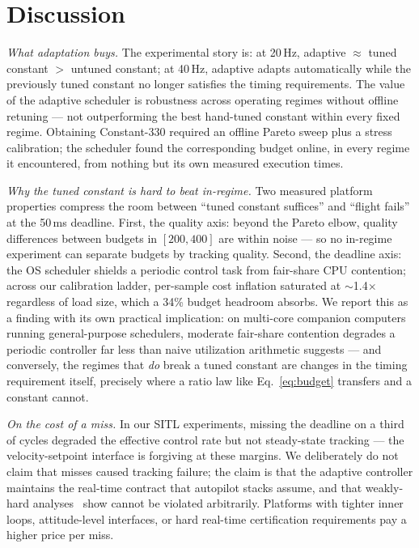 \documentclass[conference]{IEEEtran}
\begin{document}
\section{Discussion}
\label{sec:discussion}

\emph{What adaptation buys.} The experimental story is: at 20\,Hz,
adaptive $\approx$ tuned constant $>$ untuned constant; at 40\,Hz,
adaptive adapts automatically while the previously tuned constant no
longer satisfies the timing requirements. The value of the adaptive
scheduler is robustness across operating regimes without offline
retuning --- not outperforming the best hand-tuned constant within every
fixed regime. Obtaining Constant-330 required an offline Pareto sweep
plus a stress calibration; the scheduler found the corresponding budget
online, in every regime it encountered, from nothing but its own
measured execution times.

\emph{Why the tuned constant is hard to beat in-regime.} Two measured
platform properties compress the room between ``tuned constant
suffices'' and ``flight fails'' at the 50\,ms deadline. First, the
quality axis: beyond the Pareto elbow, quality differences between
budgets in $[200, 400]$ are within noise --- so no in-regime experiment
can separate budgets by tracking quality. Second, the deadline axis: the
OS scheduler shields a periodic control task from fair-share CPU
contention; across our calibration ladder, per-sample cost inflation
saturated at $\sim$1.4$\times$ regardless of load size, which a 34\%
budget headroom absorbs. We report this as a finding with its own
practical implication: on multi-core companion computers running
general-purpose schedulers, moderate fair-share contention degrades a
periodic controller far less than naive utilization arithmetic suggests
--- and conversely, the regimes that \emph{do} break a tuned constant are
changes in the timing requirement itself, precisely where a ratio law
like Eq.~\eqref{eq:budget} transfers and a constant cannot.

\emph{On the cost of a miss.} In our SITL experiments, missing the
deadline on a third of cycles degraded the effective control rate but
not steady-state tracking --- the velocity-setpoint interface is
forgiving at these margins. We deliberately do not claim that misses
caused tracking failure; the claim is that the adaptive controller
maintains the real-time contract that autopilot stacks assume, and that
weakly-hard analyses~\cite{maggio2020control} show cannot be violated
arbitrarily. Platforms with tighter inner loops, attitude-level
interfaces, or hard real-time certification requirements pay a higher
price per miss.
\end{document}
